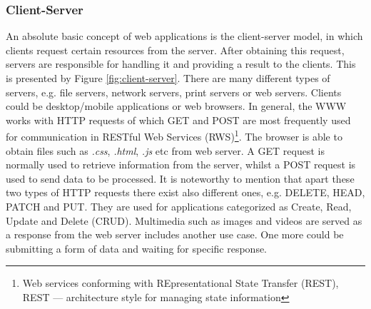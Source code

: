 \documentclass{article} %
\begin{document}
\subsubsection{Client-Server}
An absolute basic concept of web applications is the client-server model, in which clients request certain resources from the server. After obtaining this request, servers are responsible for handling it and providing a result to the clients. This is presented by Figure \ref{fig:client-server}. There are many different types of servers, e.g. file servers, network servers, print servers or web servers. Clients could be desktop/mobile applications or web browsers. In general, the WWW works with HTTP requests of which GET and POST are most frequently used for communication in RESTful Web Services (RWS)\footnote{Web services conforming with REpresentational State Transfer (REST), REST --- architecture style for managing state information}. The browser is able to obtain files such as \textit{.css}, \textit{.html}, \textit{.js} etc from web server. A GET request is normally used to retrieve information from the server, whilst a POST request is used to send data to be processed. It is noteworthy to mention that apart these two types of HTTP requests there exist also different ones, e.g. DELETE, HEAD, PATCH and PUT. They are used for applications categorized as Create, Read, Update and Delete (CRUD). Multimedia such as images and videos are served as a response from the web server includes another use case. One more could be submitting a form of data and waiting for specific response.
\end{document}
